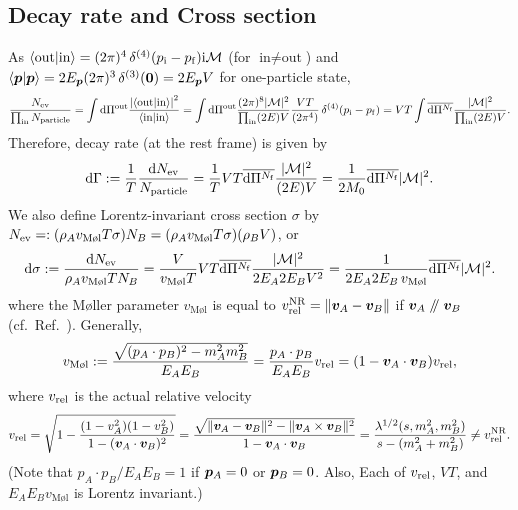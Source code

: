 \documentclass[CheatSheet]{subfiles}
\begin{document}
\subsection{Decay rate and Cross section}
As
$\braket{\text{out}|\text{in}}=(2\pi)^4\diracdelta[4](p\w i-p\w f)\ii\mathcal M$
(for $\text{in}\neq\text{out}$) and $\braket{\vc p|\vc p}=2E_{\vc p}(2\pi)^3\diracdelta[3](\vc 0)=2E_\vc {p}V$ for one-particle state,
\begin{equation}
 \frac{N\w{ev}}{\prod\w{in} N\w{particle}}
= \int\dd\Pi^{\mathrm{out}}\frac{\left|\braket{\text{out}|\text{in}}\right|^2}{\braket{\text{in}|\text{in}}}
= \int\dd\Pi^{\mathrm{out}}\frac{(2\pi)^8|\mathcal M|^2}{\prod\w{in}(2E)V}
\frac{VT}{(2\pi^4)}\diracdelta[4](p\w i-p\w f)
= VT\int\overline{\dd\Pi^{N\w f}}\frac{|\mathcal M|^2}{\prod\w{in}(2E)V}.
\end{equation}
Therefore, decay rate (at the rest frame) is given by
\begin{equation}
 \mathop{}\!\mathrm{d}\Gamma
:= \frac{1}{T}\frac{\mathop{}\!\mathrm{d} N_{\mathrm{ev}}}{N_{\mathrm{particle}}}
 = \frac{1}{T}VT\overline{\mathop{}\!\mathrm{d}\Pi^{N_{\mathrm{f}}}}\frac{|\mathcal M|^2}{(2E)V}
 = \frac{1}{2M_0}\overline{\mathop{}\!\mathrm{d}\Pi^{N_{\mathrm{f}}}}{|\mathcal M|^2}.
\end{equation}
We also define Lorentz-invariant cross section $\sigma$ by $N\w{ev}=:(\rho_A v_{\text{M\o l}}T\sigma)N_B=(\rho_A v_{\text{M\o l}}T\sigma)(\rho_B V)$, or
\begin{equation}
\dd\sigma:=\frac{\dd N\w{ev}}{\rho_A v_{\text{M\o l}}TN_B}
=
\frac{V}{v_{\text{M\o l}}T}
VT\overline{\dd\Pi^{N\w f}}\frac{|\mathcal M|^2}{2E_A2E_BV^2}
=
\frac{1}{2E_A2E_B\,v_{\text{M\o l}}}
\overline{\dd\Pi^{N\w f}}|\mathcal M|^2.
\end{equation}
where the M\o ller parameter $v_{\text{M\o l}}$ is equal to $v^{\mathrm{NR}}_{\mathrm{rel}}=\|{\bm{v}}_A-{\bm{v}}_B\|$ if ${\bm{v}}_A\mathrel{/\mkern-5mu/}{\bm{v}}_B$ (cf.~Ref.~\cite{1605.00569}).
Generally,
\begin{equation}
  v_{\text{M\o l}}:= \frac{\sqrt{(p_A\cdot p_B)^2-m_A^2m_B^2}}{E_AE_B}
=\frac{p_A\cdot p_B}{E_A E_B}v\w{rel}
=({1-\vc v_A\cdot\vc v_B})v\w{rel},
\end{equation}
where $v_{\mathrm{rel}}$ is the actual relative velocity
\begin{equation}
  v_{\mathrm{rel}}
=\sqrt{1-\frac{(1-v_A^2)(1-v_B^2)}{1-({\bm{v}}_A\cdot{\bm{v}}_B)^2}}
=\frac{\sqrt{\|{\bm{v}}_A-{\bm{v}}_B\|^2-\|{\bm{v}}_A\times{\bm{v}}_B\|^2}}{1-{\bm{v}}_A\cdot{\bm{v}}_B}
=\frac{\mathop{\lambda^{1/2}}(s,m_A^2,m_B^2)}{s-(m_A^2+m_B^2)}\neq v^{\mathrm{NR}}_{\mathrm{rel}}.
\end{equation}
(Note that $p_A\cdot p_B/E_AE_B=1$ if ${\bm{p}}_A=0$ or ${\bm{p}}_B=0$. Also, Each of $v_{\mathrm{rel}}$, $VT$, and $E_AE_Bv_{\text{M\o l}}$ is Lorentz invariant.)
\end{document}
